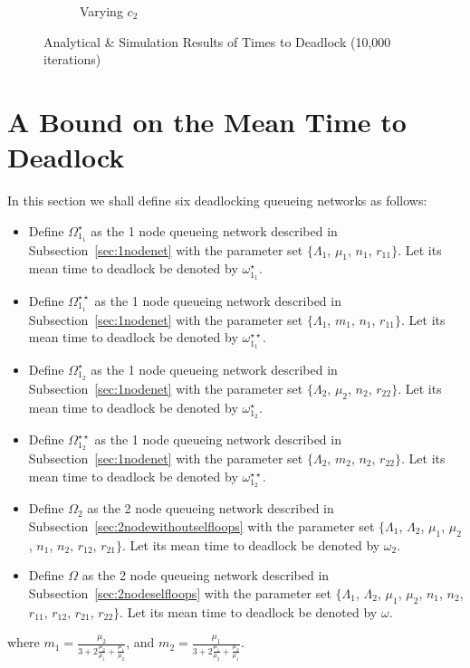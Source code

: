 \documentclass{article}
\begin{document}
\begin{figure}[!htbp]
\begin{center}
\begin{subfigure}[b]{0.34\textwidth}
    \caption{Varying $c_2$}
    \label{fig:2Nms_c2}
  \end{subfigure}
  \end{center}
  \caption{Analytical \& Simulation Results of Times to Deadlock (10,000 iterations)}
  \label{fig:timestodeadlock2nodemultiserver}
\end{figure}




\section{A Bound on the Mean Time to Deadlock}\label{sec:bound}
In this section we shall define six deadlocking queueing networks as follows:

\begin{itemize}
  \item Define $\Omega_{1_1}^{\star}$ as the 1 node queueing network described in Subsection~\ref{sec:1nodenet} with the parameter set $\{\Lambda_1$, $\mu_1$, $n_1$, $r_{11}\}$. Let its mean time to deadlock be denoted by $\omega_{1_1}^{\star}$.
  \item Define $\Omega_{1_1}^{\star\star}$ as the 1 node queueing network described in Subsection~\ref{sec:1nodenet} with the parameter set $\{\Lambda_1$, $m_1$, $n_1$, $r_{11}\}$. Let its mean time to deadlock be denoted by $\omega_{1_1}^{\star\star}$.
  \item Define $\Omega_{1_2}^{\star}$ as the 1 node queueing network described in Subsection~\ref{sec:1nodenet} with the parameter set $\{\Lambda_2$, $\mu_2$, $n_2$, $r_{22}\}$. Let its mean time to deadlock be denoted by $\omega_{1_2}^{\star}$.
  \item Define $\Omega_{1_2}^{\star\star}$ as the 1 node queueing network described in Subsection~\ref{sec:1nodenet} with the parameter set $\{\Lambda_2$, $m_2$, $n_2$, $r_{22}\}$. Let its mean time to deadlock be denoted by $\omega_{1_2}^{\star\star}$.
  \item Define $\Omega_2$ as the 2 node queueing network described in Subsection~\ref{sec:2nodewithoutselfloops} with the parameter set $\{\Lambda_1$, $\Lambda_2$, $\mu_1$, $\mu_2$, $n_1$, $n_2$, $r_{12}$, $r_{21}\}$. Let its mean time to deadlock be denoted by $\omega_2$.
  \item Define $\Omega$ as the 2 node queueing network described in Subsection~\ref{sec:2nodeselfloops} with the parameter set $\{\Lambda_1$, $\Lambda_2$, $\mu_1$, $\mu_2$, $n_1$, $n_2$, $r_{11}$, $r_{12}$, $r_{21}$, $r_{22}\}$. Let its mean time to deadlock be denoted by $\omega$.
\end{itemize}
where $m_1 = \frac{\mu_2}{3 + 2\frac{\mu_2}{\mu_1} + \frac{\mu_1}{\mu_2}}$, and $m_2 = \frac{\mu_1}{3 + 2\frac{\mu_1}{\mu_2} + \frac{\mu_2}{\mu_1}}$.
\end{document}
